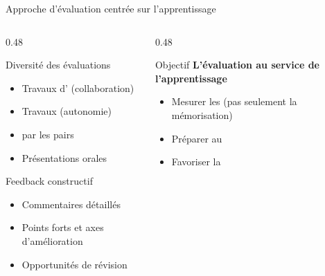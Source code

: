 \documentclass[aspectratio=169,11pt]{beamer}
\begin{document}
\begin{frame}{Approche d'évaluation centrée sur l'apprentissage}
  \begin{columns}[T]
    \begin{column}{0.48\textwidth}
      \begin{block}{Diversité des évaluations}
        \begin{itemize}
          \item Travaux d' (collaboration)
          \item Travaux  (autonomie)
          \item {} par les pairs
          \item Présentations orales
        \end{itemize}
      \end{block}
      
      \vspace{0.3em}
      
      \begin{exampleblock}{Feedback constructif}
        \small
        \begin{itemize}
          \item Commentaires détaillés
          \item Points forts et axes d'amélioration
          \item Opportunités de révision
        \end{itemize}
      \end{exampleblock}
    \end{column}
    \begin{column}{0.48\textwidth}
      \begin{alertblock}{Objectif}
        \textbf{L'évaluation au service de l'apprentissage}
        
        \vspace{0.3em}
        
        \begin{itemize}
          \item Mesurer les  (pas seulement la mémorisation)
          \item Préparer au 
          \item Favoriser la 
        \end{itemize}
      \end{alertblock}
      

\end{column}
\end{columns}
\end{frame}
\end{document}
